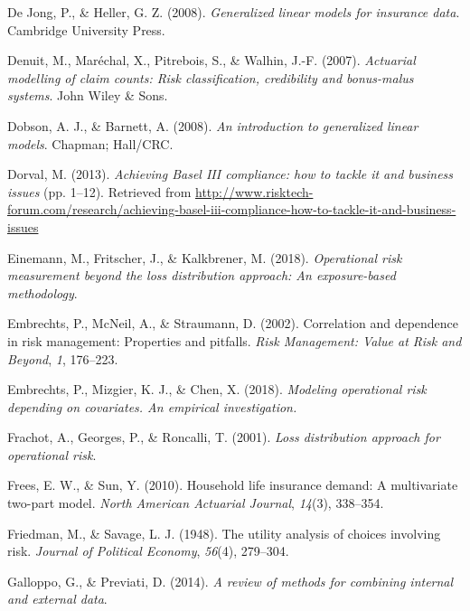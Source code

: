 \documentclass{DissertateUSU}
\begin{document}
\leavevmode\hypertarget{ref-de2008generalized}{}%
De Jong, P., \& Heller, G. Z. (2008). \emph{Generalized linear models
for insurance data}. Cambridge University Press.

\leavevmode\hypertarget{ref-denuit2007actuarial}{}%
Denuit, M., Maréchal, X., Pitrebois, S., \& Walhin, J.-F. (2007).
\emph{Actuarial modelling of claim counts: Risk classification,
credibility and bonus-malus systems}. John Wiley \& Sons.

\leavevmode\hypertarget{ref-dobson2008introduction}{}%
Dobson, A. J., \& Barnett, A. (2008). \emph{An introduction to
generalized linear models}. Chapman; Hall/CRC.

\leavevmode\hypertarget{ref-mysis2013}{}%
Dorval, M. (2013). \emph{Achieving Basel III compliance: how to tackle
it and business issues} (pp. 1--12). Retrieved from
\url{http://www.risktech-forum.com/research/achieving-basel-iii-compliance-how-to-tackle-it-and-business-issues}

\leavevmode\hypertarget{ref-einemann2018operational}{}%
Einemann, M., Fritscher, J., \& Kalkbrener, M. (2018). \emph{Operational
risk measurement beyond the loss distribution approach: An
exposure-based methodology}.

\leavevmode\hypertarget{ref-embrechts2002correlation}{}%
Embrechts, P., McNeil, A., \& Straumann, D. (2002). Correlation and
dependence in risk management: Properties and pitfalls. \emph{Risk
Management: Value at Risk and Beyond}, \emph{1}, 176--223.

\leavevmode\hypertarget{ref-embrechts2018modeling}{}%
Embrechts, P., Mizgier, K. J., \& Chen, X. (2018). \emph{Modeling
operational risk depending on covariates. An empirical investigation.}

\leavevmode\hypertarget{ref-frachot2001loss}{}%
Frachot, A., Georges, P., \& Roncalli, T. (2001). \emph{Loss
distribution approach for operational risk}.

\leavevmode\hypertarget{ref-frees2010household}{}%
Frees, E. W., \& Sun, Y. (2010). Household life insurance demand: A
multivariate two-part model. \emph{North American Actuarial Journal},
\emph{14}(3), 338--354.

\leavevmode\hypertarget{ref-friedman1948utility}{}%
Friedman, M., \& Savage, L. J. (1948). The utility analysis of choices
involving risk. \emph{Journal of Political Economy}, \emph{56}(4),
279--304.

\leavevmode\hypertarget{ref-galloppo2014review}{}%
Galloppo, G., \& Previati, D. (2014). \emph{A review of methods for
combining internal and external data}.
\end{document}
